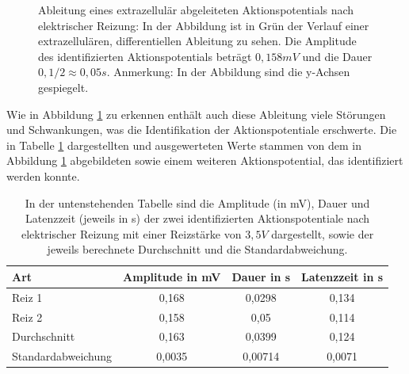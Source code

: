 \documentclass[11pt]{article}
\begin{document}
\begin{figure}[H]
\caption{Ableitung eines extrazellulär abgeleiteten Aktionspotentials nach elektrischer Reizung: In der Abbildung ist in Grün der Verlauf einer extrazellulären, differentiellen Ableitung zu sehen.  Die Amplitude des identifizierten Aktionspotentials beträgt $0,158 mV$ und die Dauer $0,1/2 \approx 0,05 s$. Anmerkung: In der Abbildung sind die y-Achsen gespiegelt.}
\label{g2}
\end{figure}

Wie in Abbildung \ref{g2} zu erkennen enthält auch diese Ableitung viele Störungen und Schwankungen, was die Identifikation der Aktionspotentiale erschwerte. Die in Tabelle \ref{werte2} dargestellten und ausgewerteten Werte stammen von dem in Abbildung \ref{g2} abgebildeten sowie einem weiteren Aktionspotential, das identifiziert werden konnte.

\begin{table}[H]
\caption{In der untenstehenden Tabelle sind die Amplitude (in mV), Dauer und Latenzzeit (jeweils in s) der zwei identifizierten Aktionspotentiale nach elektrischer Reizung mit einer Reizstärke von $3,5V$ dargestellt, sowie der jeweils berechnete Durchschnitt und die Standardabweichung.}
\begin{center}
\begin{tabular}{l||c|c|c}
Art & Amplitude in mV & Dauer in s & Latenzzeit in s\\
\hline\hline
 Reiz 1& 0,168 & 0,0298 & 0,134\\
Reiz 2& 0,158 & 0,05 & 0,114\\
\hline
Durchschnitt & 0,163 & 0,0399 & 0,124\\
Standardabweichung & 0,0035 &0,00714 & 0,0071
\end{tabular}
\end{center}
\label{werte2}
\end{table}
\end{document}
